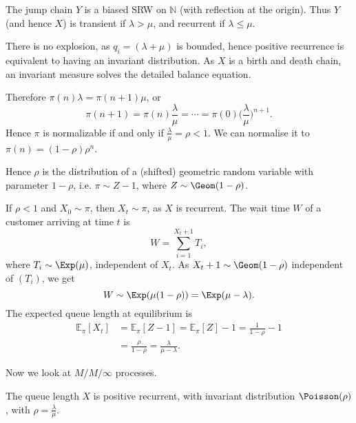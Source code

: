 \documentclass[12pt]{article}
\begin{document}
\begin{proofbox}
	The jump chain $Y$ is a biased SRW on $\mathbb{N}$ (with reflection at the origin). Thus $Y$ (and hence $X$) is transient if $\lambda > \mu$, and recurrent if $\lambda \leq \mu$.

	There is no explosion, as $q_i = (\lambda + \mu)$ is bounded, hence positive recurrence is equivalent to having an invariant distribution. As $X$ is a birth and death chain, an invariant measure solves the detailed balance equation.

	Therefore $\pi(n) \lambda = \pi(n+1)\mu$, or
	\[
	\pi(n+1) = \pi(n) \frac{\lambda}{\mu} = \cdots = \pi(0)\biggl( \frac{\lambda}{\mu} \biggr)^{n+1}
	.\]
	Hence $\pi$ is normalizable if and only if $\frac{\lambda}{\mu} = \rho < 1$. We can normalise it to $\pi(n) = (1-\rho)\rho^{n}$.

	Hence $\rho$ is the distribution of a (shifted) geometric random variable with parameter $1 - \rho$, i.e. $\pi \sim Z-1$, where $Z \sim \Geom(1 - \rho)$.

	If $\rho < 1$ and $X_0 \sim \pi$, then $X_t \sim \pi$, as $X$ is recurrent. The wait time $W$ of a customer arriving at time $t$ is
	\[
	W = \sum_{i = 1}^{X_t+1} T_i
	,\]
	where $T_i \sim \Exp(\mu)$, independent of $X_t$. As $X_t+1 \sim \Geom(1-\rho)$ independent of $(T_i)$, we get
	\[
	W \sim \Exp(\mu(1 - \rho)) = \Exp(\mu - \lambda)
	.\]
	The expected queue length at equilibrium is
	\begin{align*}
		\mathbb{E}_\pi[X_t] &= \mathbb{E}_\pi[Z- 1] = \mathbb{E}_\pi[Z] - 1 = \frac{1}{1 - \rho} - 1 \\
				    &= \frac{\rho}{1 - \rho} = \frac{\lambda}{\mu - \lambda}.
	\end{align*}
\end{proofbox}

Now we look at $M/M/\infty$ processes.

\begin{theorem}
	The queue length $X$ is positive recurrent, with invariant distribution $\Poisson(\rho)$, with $\rho = \frac{\lambda}{\mu}$.
\end{theorem}
\end{document}
